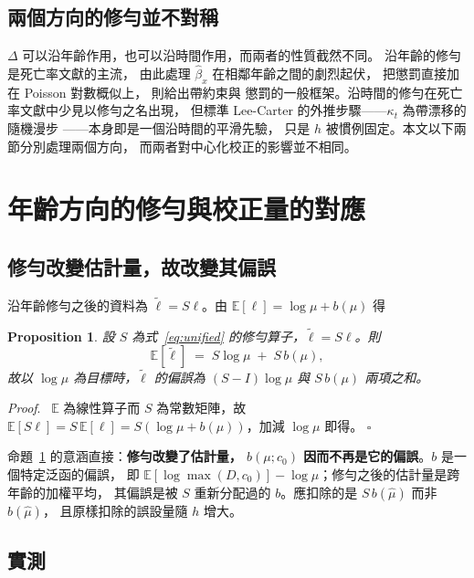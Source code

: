 \documentclass[UTF8, fontset=macnew, a4paper, 12pt]{ctexart}
\newtheorem{prop}{Proposition}
\newenvironment{proof}{\par\noindent\textit{Proof}.\ }{\hfill$\square$\par\vspace{4pt}}
\newcommand{\Ex}{\mathbb{E}}
\begin{document}
\subsection{兩個方向的修勻並不對稱}\label{subsec:two}

$\Delta$ 可以沿年齡作用，也可以沿時間作用，而兩者的性質截然不同。
沿年齡的修勻是死亡率文獻的主流，\citet{currie2004} 由此處理
$\hat\beta_x$ 在相鄰年齡之間的劇烈起伏，\citet{delwarde2007}
把懲罰直接加在 Poisson 對數概似上，\citet{currie2013} 則給出帶約束與
懲罰的一般框架。沿時間的修勻在死亡率文獻中少見以修勻之名出現，
但標準 Lee-Carter 的外推步驟——$\kappa_t$ 為帶漂移的隨機漫步
\citep{lee1992}——本身即是一個沿時間的平滑先驗，
只是 $h$ 被慣例固定。本文以下兩節分別處理兩個方向，
而兩者對中心化校正的影響並不相同。

\section{年齡方向的修勻與校正量的對應}\label{sec:age}

\subsection{修勻改變估計量，故改變其偏誤}\label{subsec:transport}

沿年齡修勻之後的資料為 $\tilde\ell = S\ell$。由 $\Ex[\ell]=\log\mu+b(\mu)$ 得

\begin{prop}\label{prop:transport}
設 $S$ 為式~\eqref{eq:unified} 的修勻算子，$\tilde\ell=S\ell$。則
$$\Ex[\tilde\ell] \;=\; S\log\mu \;+\; S\,b(\mu),$$
故以 $\log\mu$ 為目標時，$\tilde\ell$ 的偏誤為
$(S-I)\log\mu$ 與 $S\,b(\mu)$ 兩項之和。
\end{prop}

\begin{proof}
$\Ex$ 為線性算子而 $S$ 為常數矩陣，故
$\Ex[S\ell]=S\,\Ex[\ell]=S(\log\mu+b(\mu))$，加減 $\log\mu$ 即得。
\end{proof}

命題~\ref{prop:transport} 的意涵直接：\textbf{修勻改變了估計量， $b(\mu;c_0)$ 因而不再是它的偏誤}。$b$ 是一個特定泛函的偏誤，
即 $\Ex[\log\max(D,c_0)]-\log\mu$；修勻之後的估計量是跨年齡的加權平均，
其偏誤是被 $S$ 重新分配過的 $b$。應扣除的是 $S\,b(\hat\mu)$ 而非 $b(\hat\mu)$，
且原樣扣除的誤設量隨 $h$ 增大。

\subsection{實測}\label{subsec:age-emp}
\end{document}
